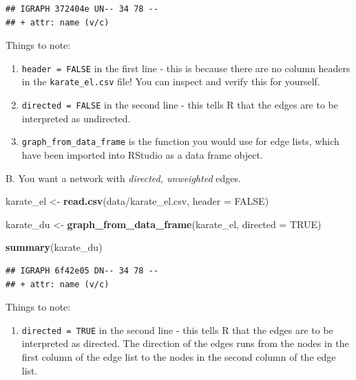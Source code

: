 \documentclass[
]{book}
\newenvironment{Shaded}{\begin{snugshade}}{\end{snugshade}}
\newcommand{\AttributeTok}[1]{\textcolor[rgb]{0.13,0.29,0.53}{#1}}
\newcommand{\ConstantTok}[1]{\textcolor[rgb]{0.56,0.35,0.01}{#1}}
\newcommand{\FunctionTok}[1]{\textcolor[rgb]{0.13,0.29,0.53}{\textbf{#1}}}
\newcommand{\NormalTok}[1]{#1}
\newcommand{\OtherTok}[1]{\textcolor[rgb]{0.56,0.35,0.01}{#1}}
\newcommand{\StringTok}[1]{\textcolor[rgb]{0.31,0.60,0.02}{#1}}
\providecommand{\tightlist}{%
  \setlength{\itemsep}{0pt}\setlength{\parskip}{0pt}}
\begin{document}
\begin{verbatim}
## IGRAPH 372404e UN-- 34 78 -- 
## + attr: name (v/c)
\end{verbatim}

Things to note:

\begin{enumerate}
\def\labelenumi{\arabic{enumi}.}
\tightlist
\item
  \texttt{header\ =\ FALSE} in the first line - this is because there are no column headers in the \texttt{karate\_el.csv} file! You can inspect and verify this for yourself.
\item
  \texttt{directed\ =\ FALSE} in the second line - this tells R that the edges are to be interpreted as undirected.
\item
  \texttt{graph\_from\_data\_frame} is the function you would use for edge lists, which have been imported into RStudio as a data frame object.
\end{enumerate}

B. You want a network with \emph{directed, unweighted} edges.

\begin{Shaded}
\begin{Highlighting}[]
\NormalTok{karate\_el }\OtherTok{\textless{}{-}} \FunctionTok{read.csv}\NormalTok{(}\StringTok{\textquotesingle{}data/karate\_el.csv\textquotesingle{}}\NormalTok{, }\AttributeTok{header =} \ConstantTok{FALSE}\NormalTok{)}

\NormalTok{karate\_du }\OtherTok{\textless{}{-}} \FunctionTok{graph\_from\_data\_frame}\NormalTok{(karate\_el, }\AttributeTok{directed =} \ConstantTok{TRUE}\NormalTok{)}

\FunctionTok{summary}\NormalTok{(karate\_du)}
\end{Highlighting}
\end{Shaded}

\begin{verbatim}
## IGRAPH 6f42e05 DN-- 34 78 -- 
## + attr: name (v/c)
\end{verbatim}

Things to note:

\begin{enumerate}
\def\labelenumi{\arabic{enumi}.}
\tightlist
\item
  \texttt{directed\ =\ TRUE} in the second line - this tells R that the edges are to be interpreted as directed. The direction of the edges runs from the nodes in the first column of the edge list to the nodes in the second column of the edge list.
\end{enumerate}
\end{document}
